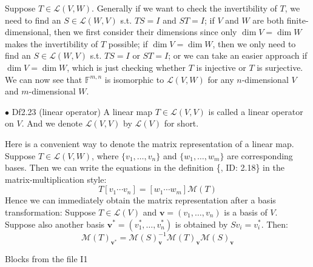 \documentclass{article}
\begin{document}
\begin{Rmk}{}
    Suppose $T\in\mathcal{L}(V, W)$. Generally if we want to check the invertibility of $T$, we need to find an $S\in\mathcal{L}(W, V)$ s.t. $TS = I$ and $ST = I$; if $V$ and $W$ are both finite-dimensional, then we first consider their dimensions since only $\dim V = \dim W$ makes the invertibility of $T$ possible; if $\dim V = \dim W$, then we only need to find an $S\in\mathcal{L}(W, V)$ s.t. $TS = I$ or $ST = I$; or we can take an easier approach if $\dim V = \dim W$, which is just checking whether $T$ is injective or $T$ is surjective.\\
    \textcolor{Th}{We can now see that $\mathbb{F}^{m,n}$ is isomorphic to $\mathcal{L}(V, W)$ for any $n$-dimensional $V$ and $m$-dimensional $W$.}
\end{Rmk}

\begin{Df}{$\bullet$ Df2.23 (linear operator)}
    A linear map $T\in\mathcal{L}(V, V)$ is called a linear operator on $V$. And we denote $\mathcal{L}(V,V)$ by $\mathcal{L}(V)$ for short.
\end{Df}

\begin{Rmk}{}
    Here is a convenient way to denote the matrix representation of a linear map. Suppose $T\in\mathcal{L}(V, W)$, where $\{v_1, \dots, v_n\}$ and $\{w_1, \dots, w_m\}$ are corresponding bases. Then we can write the equations in the definition \{, ID: 2.18\} in the matrix-multiplication style:
    $$T[v_1 \cdots v_n] = [w_1 \cdots w_m]\mathcal{M}(T)$$
    Hence we can immediately obtain the matrix representation after a basis transformation:
    \textcolor{Th}{Suppose $T\in\mathcal{L}(V)$ and $\pmb{v} = (v_1, \dots, v_n)$ is a basis of $V$. Suppose also another basis $\pmb{v}^\ast = (v_1^\ast, \dots, v_n^\ast)$ is obtained by $Sv_i = v_i^\ast$. Then:}
    \textcolor{Th}{
    $$\mathcal{M}(T)_{\pmb{v^\ast}} = \mathcal{M}(S)_{\pmb{v}}^{-1} \mathcal{M}(T)_{\pmb{v}} \mathcal{M}(S)_{\pmb{v}}$$}
\end{Rmk}

\begin{Th}{Blocks from the file I1}
\end{Th}
\end{document}
